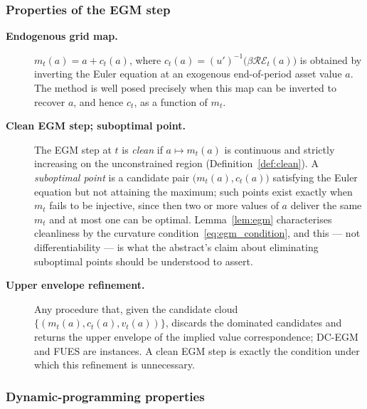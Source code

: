 \subsubsection{Properties of the EGM step}

\begin{description}

\item[\textnormal{\textbf{Endogenous grid map.}}]
$m_t(a)=a+c_t(a)$, where $c_t(a)=(u')^{-1}\big(\beta\mathcal{R}\mathcal{E}_t(a)\big)$ is
obtained by inverting the Euler equation at an exogenous end-of-period asset value $a$.
The method is well posed precisely when this map can be inverted to recover $a$, and
hence $c_t$, as a function of $m_t$.

\item[\textnormal{\textbf{Clean EGM step; suboptimal point.}}]
The EGM step at $t$ is \emph{clean} if $a\mapsto m_t(a)$ is continuous and strictly
increasing on the unconstrained region (Definition~\ref{def:clean}). A
\emph{suboptimal point} is a candidate pair $\big(m_t(a),c_t(a)\big)$ satisfying the
Euler equation but not attaining the maximum; such points exist exactly when $m_t$
fails to be injective, since then two or more values of $a$ deliver the same $m_t$ and
at most one can be optimal. Lemma~\ref{lem:egm} characterises cleanliness by the
curvature condition~\eqref{eq:egm_condition}, and this --- not differentiability --- is
what the abstract's claim about eliminating suboptimal points should be understood to
assert.

\item[\textnormal{\textbf{Upper envelope refinement.}}]
Any procedure that, given the candidate cloud $\{(m_t(a),c_t(a),v_t(a))\}$, discards the
dominated candidates and returns the upper envelope of the implied value
correspondence; DC-EGM \citep{Iskhakov2017-jb} and FUES
\citep{Dobrescu2022-ii} are instances. A clean EGM step is exactly the condition under
which this refinement is unnecessary.

\end{description}

\subsubsection{Dynamic-programming properties}

